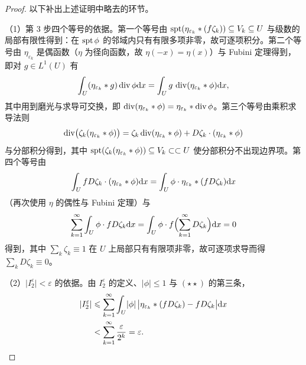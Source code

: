 \documentclass[../../main.tex]{subfiles}%
\begin{document}
\begin{proof}
以下补出上述证明中略去的环节。

（1）第 3 步四个等号的依据。第一个等号由 $\operatorname{spt}(\eta_{\varepsilon_k}*(f\zeta_k))\subseteq V_k\subseteq U$ 与级数的局部有限性得到：在 $\operatorname{spt}\phi$ 的邻域内只有有限多项非零，故可逐项积分。第二个等号由 $\eta_{\varepsilon_k}$ 是偶函数（$\eta$ 为径向函数，故 $\eta(-x)=\eta(x)$）与 Fubini 定理得到，即对 $g\in L^1(U)$ 有
\begin{align*}
\int_U(\eta_{\varepsilon_k}*g)\operatorname{div}\phi\mathrm{d} x=\int_U g\,\operatorname{div}(\eta_{\varepsilon_k}*\phi)\mathrm{d} x,
\end{align*}
其中用到磨光与求导可交换，即 $\operatorname{div}(\eta_{\varepsilon_k}*\phi)=\eta_{\varepsilon_k}*\operatorname{div}\phi$。第三个等号由乘积求导法则
\begin{align*}
\operatorname{div}\bigl(\zeta_k(\eta_{\varepsilon_k}*\phi)\bigr)=\zeta_k\operatorname{div}(\eta_{\varepsilon_k}*\phi)+D\zeta_k\cdot(\eta_{\varepsilon_k}*\phi)
\end{align*}
与分部积分得到，其中 $\operatorname{spt}(\zeta_k(\eta_{\varepsilon_k}*\phi))\subseteq V_k\subset\subset U$ 使分部积分不出现边界项。第四个等号由
\begin{align*}
\int_U fD\zeta_k\cdot(\eta_{\varepsilon_k}*\phi)\mathrm{d} x=\int_U\phi\cdot\eta_{\varepsilon_k}*(fD\zeta_k)\mathrm{d} x
\end{align*}
（再次使用 $\eta$ 的偶性与 Fubini 定理）与
\begin{align*}
\sum_{k=1}^{\infty}\int_U\phi\cdot fD\zeta_k\mathrm{d} x=\int_U\phi\cdot f\Bigl(\sum_{k=1}^{\infty}D\zeta_k\Bigr)\mathrm{d} x=0
\end{align*}
得到，其中 $\sum_k\zeta_k\equiv1$ 在 $U$ 上局部只有有限项非零，故可逐项求导而得 $\sum_kD\zeta_k\equiv0$。

（2）$\lvert I_2^{\varepsilon}\rvert<\varepsilon$ 的依据。由 $I_2^{\varepsilon}$ 的定义、$\lvert\phi\rvert\leqslant1$ 与 $(\star\star)$ 的第三条，
\begin{align*}
\lvert I_2^{\varepsilon}\rvert&\leqslant\sum_{k=1}^{\infty}\int_U\lvert\phi\rvert\,\bigl\lvert\eta_{\varepsilon_k}*(fD\zeta_k)-fD\zeta_k\bigr\rvert\mathrm{d} x\\
&<\sum_{k=1}^{\infty}\frac{\varepsilon}{2^{k}}=\varepsilon .
\end{align*}


\end{proof}
\end{document}
